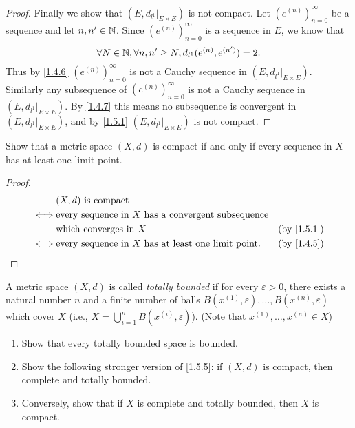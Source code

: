 \begin{proof}
  Finally we show that \((E, d_{l^1}|_{E \times E})\) is not compact.
  Let \((e^{(n)})_{n = 0}^\infty\) be a sequence and let \(n, n' \in \mathbb{N}\).
  Since \((e^{(n)})_{n = 0}^\infty\) is a sequence in \(E\), we know that
  \[
    \forall N \in \mathbb{N}, \forall n, n' \geq N, d_{l^1}(e^{(n)}, e^{(n')}) = 2.
  \]
  Thus by \cref{1.4.6} \((e^{(n)})_{n = 0}^\infty\) is not a Cauchy sequence in \((E, d_{l^1}|_{E \times E})\).
  Similarly any subsequence of \((e^{(n)})_{n = 0}^\infty\) is not a Cauchy sequence in \((E, d_{l^1}|_{E \times E})\).
  By \cref{1.4.7} this means no subsequence is convergent in \((E, d_{l^1}|_{E \times E})\), and by \cref{1.5.1} \((E, d_{l^1}|_{E \times E})\) is not compact.
\end{proof}

\begin{ex}\label{ex:1.5.9}
  Show that a metric space \((X, d)\) is compact if and only if every sequence in \(X\) has at least one limit point.
\end{ex}

\begin{proof}
  \begin{align*}
         & (X, d) \text{ is compact}                                                                    \\
    \iff & \text{every sequence in } X \text{ has a convergent subsequence}                             \\
         & \text{which converges in } X                                      & \text{(by \cref{1.5.1})} \\
    \iff & \text{every sequence in } X \text{ has at least one limit point}. & \text{(by \cref{1.4.5})}
  \end{align*}
\end{proof}

\begin{ex}\label{ex:1.5.10}
  A metric space \((X, d)\) is called \emph{totally bounded} if for every \(\varepsilon > 0\), there exists a natural number \(n\) and a finite number of balls \(B(x^{(1)}, \varepsilon), \dots, B(x^{(n)}, \varepsilon)\) which cover \(X\) (i.e., \(X = \bigcup_{i = 1}^n B(x^{(i)}, \varepsilon)\)).
  (Note that \(x^{(1)}, \dots, x^{(n)} \in X\))
  \begin{enumerate}
    \item Show that every totally bounded space is bounded.
    \item Show the following stronger version of \cref{1.5.5}:
          if \((X, d)\) is compact, then complete and totally bounded.
    \item Conversely, show that if \(X\) is complete and totally bounded, then \(X\) is compact.
  \end{enumerate}
\end{ex}

